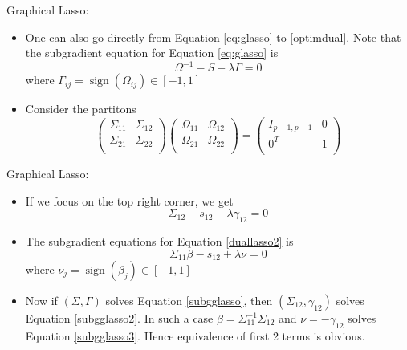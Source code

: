 \documentclass[xcolor=dvipsnames,aspectratio=1610]{beamer}
\DeclareMathOperator*{\sign}{sign}
\theoremstyle{remark}
\begin{document}
\begin{frame}{Graphical Lasso:}
  \begin{itemize}
    \setlength{\itemsep}{10pt}
\item One can also go directly from Equation \ref{eq:glasso} to \ref{optimdual}. Note that the subgradient equation for Equation \ref{eq:glasso} is
\begin{equation} \label{subgglasso}
\Omega^{-1} - S - \lambda \Gamma = 0 
\end{equation}
where $\Gamma_{ij} = \sign(\Omega_{ij}) \in [-1,1]$
\item Consider the partitons 
\begin{equation*}
\begin{pmatrix} 
\Sigma_{11}&\Sigma_{12}\\
\Sigma_{21}&\Sigma_{22}\\
\end{pmatrix} 
\begin{pmatrix} 
\Omega_{11}&\Omega_{12}\\
\Omega_{21}&\Omega_{22}\\
\end{pmatrix}
= \begin{pmatrix} 
I_{p-1,p-1}&0\\
0^T&1\\
\end{pmatrix}
\end{equation*}
  \end{itemize}
\end{frame}

\begin{frame}{Graphical Lasso:}
  \begin{itemize}
    \setlength{\itemsep}{10pt}
\item If we focus on the top right corner, we get 
\begin{equation} \label{subgglasso2}
\Sigma_{12} - s_{12} - \lambda \gamma_{12} = 0 
\end{equation}
\item The subgradient equations for Equation \ref{duallasso2} is
\begin{equation} \label{subgglasso3}
\Sigma_{11} \beta - s_{12} + \lambda \nu = 0 
\end{equation}
where $\nu_j = \sign(\beta_j) \in [-1,1]$
\item Now if $(\Sigma, \Gamma)$ solves Equation \ref{subgglasso}, then $(\Sigma_{12}, \gamma_{12})$ solves Equation \ref{subgglasso2}. In such a  case $\beta = \Sigma_{11}^{-1} \Sigma_{12}$ and $\nu = - \gamma_{12}$ solves Equation \ref{subgglasso3}. Hence equivalence of first 2 terms is obvious. 
  \end{itemize}
\end{frame}
\end{document}

